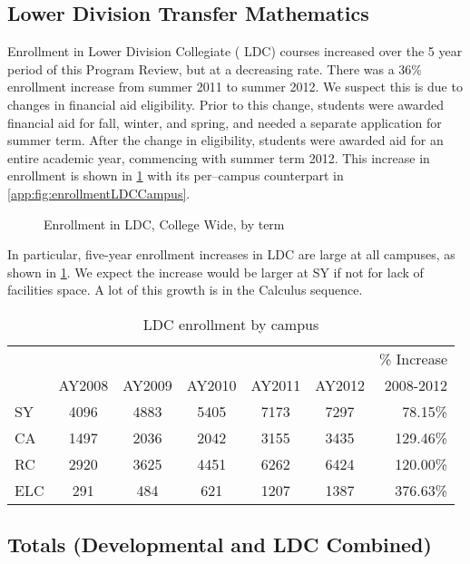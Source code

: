 \subsection{Lower Division Transfer Mathematics}
Enrollment in Lower Division Collegiate ( LDC) courses increased over the 5 year period of this Program Review, but at a decreasing rate. There was a 36\% enrollment increase from summer 2011 to summer 2012. We suspect this is due to changes in financial aid eligibility. Prior to this change, students were awarded financial aid for fall, winter, and spring, and needed a separate application for summer term.  After the change in eligibility, students were awarded aid for an entire academic year, commencing with summer term 2012.  This increase in enrollment is shown in \cref{needs:fig:enrollmentLDCTerm} with its per--campus counterpart in \vref{app:fig:enrollmentLDCCampus}.

\begin{figure}[!htb]
	\centering
	
	\caption{Enrollment in LDC, College Wide, by term}
    \label{needs:fig:enrollmentLDCTerm}
\end{figure}

In particular, five-year enrollment increases  in LDC are large at all campuses, as shown in \cref{needs:tab:LDCenrollmentCampus}.  We expect the increase would be larger at SY if not for lack of facilities space. A lot of this growth is in the Calculus sequence.   

\begin{table}[!htb]
  \centering
  \caption{LDC enrollment by campus}
  \label{needs:tab:LDCenrollmentCampus}
	\begin{tabular}{l*{5}{c}r}
    \toprule
                &   &   &   &   &   &   \% Increase \\
                & AY2008  & AY2009 &  AY2010 &   AY2011 &  AY2012 &   2008-2012\\
                \midrule
            SY  & 4096    & 4883   &  5405   &   7173   &  7297   &   78.15\%  \\
            CA  & 1497    & 2036   &  2042   &   3155   &  3435   &   129.46\% \\
            RC  & 2920    & 3625   &  4451   &   6262   &  6424   &   120.00\% \\
            ELC & 291     &   484  &621      & 1207     &1387     & 376.63\%   \\
    \bottomrule
  \end{tabular}
\end{table}

\subsection{Totals (Developmental and LDC Combined)}
